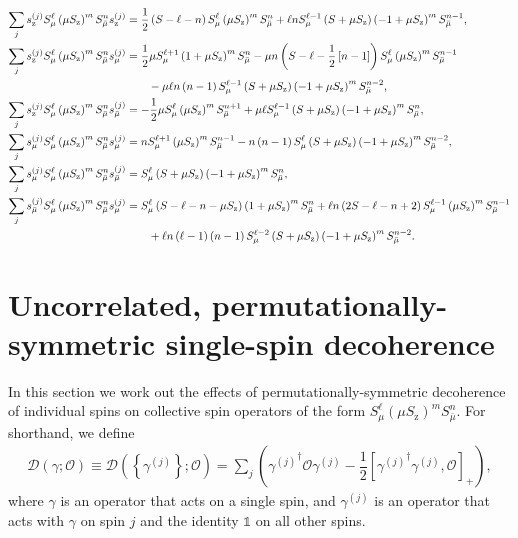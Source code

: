 \documentclass[pra,reprint,longbibliography]{revtex4-1}
\newcommand{\f}[2]{\dfrac{#1}{#2}} %
\newcommand{\p}[1]{\left(#1\right)} %
\renewcommand{\sp}[1]{\left[#1\right]} %
\renewcommand{\set}[1]{\left\{#1\right\}} %
\newcommand{\D}{\mathcal{D}}
\renewcommand{\O}{\mathcal{O}}
\newcommand{\z}{\text{z}}
\newcommand{\bmu}{{\bar\mu}}
\newcommand{\1}{\mathds{1}}
\begin{document}
\begin{align}
  \sum_j s_\z^{(j)} S_\mu^\ell \p{\mu S_\z}^m S_\bmu^n s_\z^{(j)}
  &= \f12 \p{S-\ell-n} S_\mu^\ell \p{\mu S_\z}^m S_\bmu^n
  + \ell n S_\mu^{\ell-1} \p{S+\mu S_\z}
  \p{-1+\mu S_\z}^m S_\bmu^{n-1},
  \label{eq:san_z_z} \allowdisplaybreaks \\
  \sum_j s_\z^{(j)} S_\mu^\ell \p{\mu S_\z}^m S_\bmu^n s_\mu^{(j)}
  &= \f12 \mu S_\mu^{\ell+1} \p{1+\mu S_\z}^m S_\bmu^n
  - \mu n \p{S-\ell-\f12\sp{n-1}} S_\mu^\ell
  \p{\mu S_\z}^m S_\bmu^{n-1} \notag \\
  &\qquad - \mu\ell n\p{n-1} S_\mu^{\ell-1}
  \p{S+\mu S_\z} \p{-1+\mu S_\z}^m S_\bmu^{n-2},
  \label{eq:san_z_mu} \allowdisplaybreaks \\
  \sum_j s_\z^{(j)} S_\mu^\ell \p{\mu S_\z}^m S_\bmu^n s_\bmu^{(j)}
  &= -\f12 \mu S_\mu^\ell \p{\mu S_\z}^m S_\bmu^{n+1}
  + \mu \ell S_\mu^{\ell-1} \p{S+\mu S_\z} \p{-1+\mu S_\z}^m S_\bmu^n,
  \label{eq:san_z_bmu} \allowdisplaybreaks \\
  \sum_j s_\mu^{(j)} S_\mu^\ell \p{\mu S_\z}^m S_\bmu^n s_\mu^{(j)}
  &= n S_\mu^{\ell+1} \p{\mu S_\z}^m S_\bmu^{n-1}
  - n\p{n-1} S_\mu^\ell \p{S+\mu S_\z} \p{-1+\mu S_\z}^m S_\bmu^{n-2},
  \label{eq:san_mu_mu} \allowdisplaybreaks \\
  \sum_j s_\mu^{(j)} S_\mu^\ell \p{\mu S_\z}^m S_\bmu^n s_\bmu^{(j)}
  &= S_\mu^\ell \p{S+\mu S_\z}\p{-1+\mu S_\z}^m S_\bmu^n,
  \label{eq:san_mu_bmu} \allowdisplaybreaks \\
  \sum_j s_\bmu^{(j)} S_\mu^\ell \p{\mu S_\z}^m S_\bmu^n s_\mu^{(j)}
  &= S_\mu^\ell \p{S - \ell - n - \mu S_\z}
  \p{1+\mu S_\z}^m S_\bmu^n
  + \ell n \p{2S - \ell - n + 2}
  S_\mu^{\ell-1} \p{\mu S_\z}^m S_\bmu^{n-1} \notag \\
  &\qquad + \ell n \p{\ell-1} \p{n-1} S_\mu^{\ell-2} \p{S+\mu S_\z}
  \p{-1+\mu S_\z}^m S_\bmu^{n-2}.
  \label{eq:san_bmu_mu}
\end{align}


\section{Uncorrelated, permutationally-symmetric single-spin
  decoherence}
\label{sec:decoherence_single}

In this section we work out the effects of permutationally-symmetric
decoherence of individual spins on collective spin operators of the
form $S_\mu^\ell \p{\mu S_\z}^m S_\bmu^n$.  For shorthand, we define
\begin{align}
  \D\p{\gamma;\O} \equiv \D\p{\set{\gamma^{(j)}};\O}
  = \sum_j\p{{\gamma^{(j)}}^\dag \O \gamma^{(j)}
    - \f12\sp{{\gamma^{(j)}}^\dag \gamma^{(j)}, \O}_+},
\end{align}
where $\gamma$ is an operator that acts on a single spin, and
$\gamma^{(j)}$ is an operator that acts with $\gamma$ on spin $j$ and
the identity $\1$ on all other spins.
\end{document}
